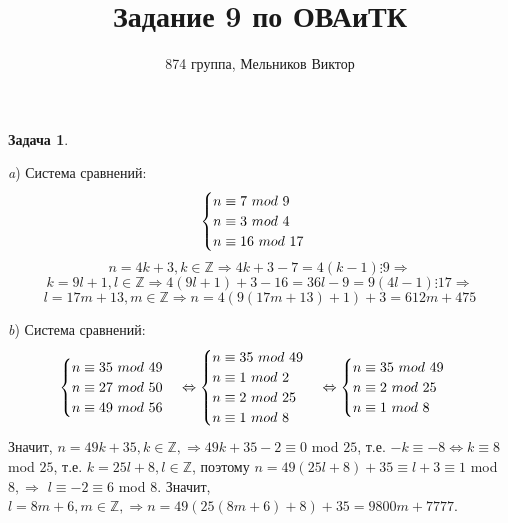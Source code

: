 \documentclass[12pt]{article}
\theoremstyle{definition}
\newtheorem{task}{Задача}
\def\ZZ{\mathbb Z}
\begin{document}
 
\title{Задание 9 по ОВАиТК}
\author{874 группа, Мельников Виктор}
 
 
\date{} 
\maketitle


\begin{task} 
\textit{}

\textit{a}) Система сравнений:
	\begin{equation*}
		\begin{cases}
   		n \equiv 7 $ $mod$ $ 9 \\
   		n \equiv 3 $ $mod $ $4 \\
   		n \equiv 16 $ $mod $ $17
 		\end{cases}
	\end{equation*}
$$n=4k+3,k\in \ZZ \Rightarrow 4k+3-7=4(k-1) \vdots 9 \Rightarrow$$
$$k=9l+1,l\in \ZZ \Rightarrow 4(9l+1)+3-16=36l-9=9(4l-1)\vdots 17 \Rightarrow$$
$$ l=17m+13,m\in \ZZ \Rightarrow n=4(9(17m+13)+1)+3=612m+475  $$

\textit{b})  Система сравнений:
	\begin{equation*}
		\begin{cases}
   		n \equiv 35 $ $mod$ $ 49 \\
   		n \equiv 27 $ $mod $ $ 50 \\
   		n \equiv 49 $ $mod $ $ 56
 		\end{cases}
 		\Leftrightarrow
 		\begin{cases}
   		n \equiv 35 $ $mod $ $ 49 \\
   		n \equiv 1 $ $mod $ $ 2 \\
   		n \equiv 2 $ $mod $ $ 25 \\
   		n \equiv 1 $ $mod $ $ 8
 		\end{cases}
 		\Leftrightarrow
 		\begin{cases}
   		n \equiv 35 $ $mod $ $ 49 \\
   		n \equiv 2 $ $mod $ $ 25 \\
   		n \equiv 1 $ $mod $ $ 8
 		\end{cases}
	\end{equation*}
Значит, $n=49k+35, k \in \ZZ, \Rightarrow 49k+35-2\equiv 0$ mod $25$, т.е. $-k\equiv-8 \Leftrightarrow k\equiv 8$ mod $25$, т.е. $k=25l+8, l\in \ZZ$, поэтому $n=49(25l+8)+35\equiv l+3\equiv 1$ mod $8, \Rightarrow$ $l\equiv -2 \equiv 6$ mod $8$. Значит, $l=8m+6, m\in \ZZ, \Rightarrow n=49(25(8m+6)+8)+35=9800m+7777$.

\end{task}
\end{document}
